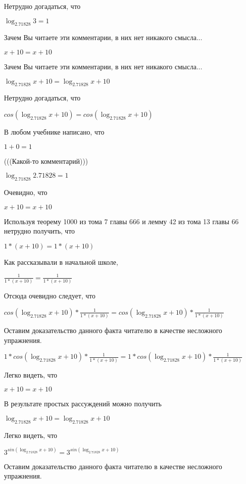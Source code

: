 \documentclass[12pt,a4paper,fleqn]{article}
\theoremstyle{definition}
\begin{document}
Нетрудно догадаться, что 

$\log_{ 2.71828 }{ 3 } =  1 $

Зачем Вы читаете эти комментарии, в них нет никакого смысла... 

$ x  +  10  =  x  +  10 $

Зачем Вы читаете эти комментарии, в них нет никакого смысла... 

$\log_{ 2.71828 }{ x  +  10 } = \log_{ 2.71828 }{ x  +  10 }$

Нетрудно догадаться, что 

$cos(\log_{ 2.71828 }{ x  +  10 }) = cos(\log_{ 2.71828 }{ x  +  10 })$

В любом учебнике написано, что 

$ 1  +  0  =  1 $

(((Какой-то комментарий))) 

$\log_{ 2.71828 }{ 2.71828 } =  1 $

Очевидно, что 

$ x  +  10  =  x  +  10 $

Используя теорему 1000 из тома 7 главы 666 и лемму 42 из тома 13 главы 66 нетрудно получить, что 

$ 1  * ( x  +  10 ) =  1  * ( x  +  10 )$

Как рассказывали в начальной школе, 

$\frac{ 1 }{ 1  * ( x  +  10 )}
 = \frac{ 1 }{ 1  * ( x  +  10 )}
$

Отсюда очевидно следует, что 

$cos(\log_{ 2.71828 }{ x  +  10 }) * \frac{ 1 }{ 1  * ( x  +  10 )}
 = cos(\log_{ 2.71828 }{ x  +  10 }) * \frac{ 1 }{ 1  * ( x  +  10 )}
$

Оставим доказательство данного факта читателю в качестве несложного упражнения. 

$ 1  * cos(\log_{ 2.71828 }{ x  +  10 }) * \frac{ 1 }{ 1  * ( x  +  10 )}
 =  1  * cos(\log_{ 2.71828 }{ x  +  10 }) * \frac{ 1 }{ 1  * ( x  +  10 )}
$

Легко видеть, что 

$ x  +  10  =  x  +  10 $

В результате простых рассуждений можно получить 

$\log_{ 2.71828 }{ x  +  10 } = \log_{ 2.71828 }{ x  +  10 }$

Легко видеть, что 

${ 3 }^{sin(\log_{ 2.71828 }{ x  +  10 })} = { 3 }^{sin(\log_{ 2.71828 }{ x  +  10 })}$

Оставим доказательство данного факта читателю в качестве несложного упражнения. 
\end{document}
